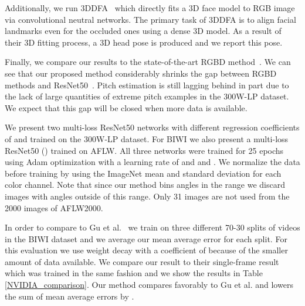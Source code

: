 \documentclass[10pt,twocolumn,letterpaper]{article}
\begin{document}
Additionally, we run 3DDFA~\cite{zhu2016face} which directly fits a 3D face model to RGB image via convolutional neutral networks. The primary task of 3DDFA is to align facial landmarks even for the occluded ones using a dense 3D model. As a result of their 3D fitting process, a 3D head pose is produced and we report this pose.

Finally, we compare our results to the state-of-the-art RGBD method~\cite{3DMM}. We can see that our proposed method considerably shrinks the gap between RGBD methods and ResNet50~\cite{He2015}. Pitch estimation is still lagging behind in part due to the lack of large quantities of extreme pitch examples in the 300W-LP dataset. We expect that this gap will be closed when more data is available.

We present two multi-loss ResNet50 networks with different regression coefficients of  and  trained on the 300W-LP dataset. For BIWI we also present a multi-loss ResNet50 () trained on AFLW. All three networks were trained for 25 epochs using Adam optimization\cite{kingma2014adam} with a learning rate of  and  and . We normalize the data before training by using the ImageNet mean and standard deviation for each color channel. Note that since our method bins angles in the  range we discard images with angles outside of this range. Only 31 images are not used from the 2000 images of AFLW2000.

In order to compare to Gu et al.~\cite{nvidia} we train on three different 70-30 splits of videos in the BIWI dataset and we average our mean average error for each split. For this evaluation we use weight decay with a coefficient of  because of the smaller amount of data available. We compare our result to their single-frame result which was trained in the same fashion and we show the results in Table \ref{NVIDIA_comparison}. Our method compares favorably to Gu et al. and lowers the sum of mean average errors by .
\end{document}
